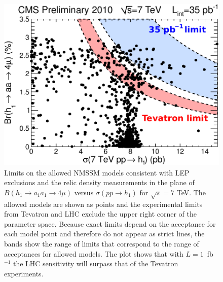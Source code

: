 \begin{figure}
\begin{center}
\includegraphics[width=0.48\linewidth]{PLOTS/limits_on_models_7tev.pdf}
\end{center}

\caption{Limits on the allowed NMSSM models consistent with LEP exclusions and the relic density measurements in the plane of $B(h_1 \to a_1 a_1 \to 4 \mu)$ versus $\sigma (pp \to h_1)$ for $\sqrt{s}=7$ TeV. The allowed models are shown as points and the experimental limits from Tevatron and LHC exclude the upper right corner of the parameter space. Because exact limits depend on the acceptance for each model point and therefore do not appear as strict lines, the bands show the range of limits that correspond to the range of acceptances for allowed models. The plot shows that with $L=1$~fb$^{-1}$ the LHC sensitivity will surpass that of the Tevatron experiments. \label{fig:ulimit2}}
\end{figure}


